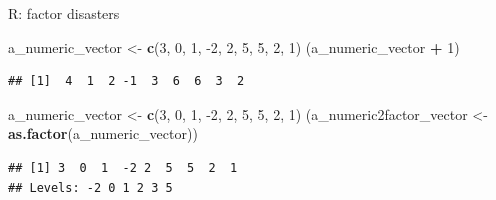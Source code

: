 \documentclass[
  ignorenonframetext,
]{beamer}
\newenvironment{Shaded}{\begin{snugshade}}{\end{snugshade}}
\newcommand{\DecValTok}[1]{\textcolor[rgb]{0.00,0.00,0.81}{#1}}
\newcommand{\KeywordTok}[1]{\textcolor[rgb]{0.13,0.29,0.53}{\textbf{#1}}}
\newcommand{\NormalTok}[1]{#1}
\newcommand{\OperatorTok}[1]{\textcolor[rgb]{0.81,0.36,0.00}{\textbf{#1}}}
\newcommand{\StringTok}[1]{\textcolor[rgb]{0.31,0.60,0.02}{#1}}
\begin{document}
\begin{frame}[fragile]{R: factor disasters}
\protect\hypertarget{r-factor-disasters}{}

\begin{Shaded}
\begin{Highlighting}[]
\NormalTok{a_numeric_vector <-}\StringTok{ }\KeywordTok{c}\NormalTok{(}\DecValTok{3}\NormalTok{, }\DecValTok{0}\NormalTok{, }\DecValTok{1}\NormalTok{, }\DecValTok{-2}\NormalTok{, }\DecValTok{2}\NormalTok{, }\DecValTok{5}\NormalTok{, }\DecValTok{5}\NormalTok{, }\DecValTok{2}\NormalTok{, }\DecValTok{1}\NormalTok{)}
\NormalTok{(a_numeric_vector }\OperatorTok{+}\StringTok{ }\DecValTok{1}\NormalTok{)}
\end{Highlighting}
\end{Shaded}

\begin{verbatim}
## [1]  4  1  2 -1  3  6  6  3  2
\end{verbatim}

\end{frame}

\begin{frame}[fragile]

\begin{Shaded}
\begin{Highlighting}[]
\NormalTok{a_numeric_vector <-}\StringTok{ }\KeywordTok{c}\NormalTok{(}\DecValTok{3}\NormalTok{, }\DecValTok{0}\NormalTok{, }\DecValTok{1}\NormalTok{, }\DecValTok{-2}\NormalTok{, }\DecValTok{2}\NormalTok{, }\DecValTok{5}\NormalTok{, }\DecValTok{5}\NormalTok{, }\DecValTok{2}\NormalTok{, }\DecValTok{1}\NormalTok{)}
\NormalTok{(a_numeric2factor_vector <-}\StringTok{ }\KeywordTok{as.factor}\NormalTok{(a_numeric_vector))}
\end{Highlighting}
\end{Shaded}

\begin{verbatim}
## [1] 3  0  1  -2 2  5  5  2  1 
## Levels: -2 0 1 2 3 5
\end{verbatim}

\end{frame}
\end{document}
